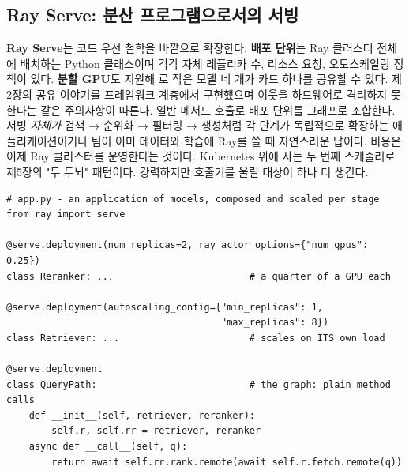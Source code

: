 \subsection*{Ray Serve: 분산 프로그램으로서의 서빙}

\textbf{Ray Serve}는 코드 우선 철학을 바깥으로 확장한다. \textbf{배포 단위}는 Ray 클러스터 전체에 배치하는 Python 클래스이며 각각 자체 레플리카 수, 리소스 요청, 오토스케일링 정책이 있다. \textbf{분할 GPU}도 지원해 로 작은 모델 네 개가 카드 하나를 공유할 수 있다. 제2장의 공유 이야기를 프레임워크 계층에서 구현했으며 이웃을 하드웨어로 격리하지 못한다는 같은 주의사항이 따른다. 일반 메서드 호출로 배포 단위를 그래프로 조합한다. 서빙 \textit{자체가} 검색 → 순위화 → 필터링 → 생성처럼 각 단계가 독립적으로 확장하는 애플리케이션이거나 팀이 이미 데이터와 학습에 Ray를 쓸 때 자연스러운 답이다. 비용은 이제 Ray 클러스터를 운영한다는 것이다. Kubernetes 위에 사는 두 번째 스케줄러로 제5장의 "두 두뇌" 패턴이다. 강력하지만 호출기를 울릴 대상이 하나 더 생긴다.

\begin{terminalbox}
\begin{Verbatim}[breaklines=true,breakanywhere=true,fontsize=\small,formatcom=\color{tbbtermfg},codes=\tbbcodeactive]
# app.py - an application of models, composed and scaled per stage
from ray import serve

@serve.deployment(num_replicas=2, ray_actor_options={"num_gpus": 0.25})
class Reranker: ...                        # a quarter of a GPU each

@serve.deployment(autoscaling_config={"min_replicas": 1,
                                      "max_replicas": 8})
class Retriever: ...                       # scales on ITS own load

@serve.deployment
class QueryPath:                           # the graph: plain method calls
    def __init__(self, retriever, reranker):
        self.r, self.rr = retriever, reranker
    async def __call__(self, q):
        return await self.rr.rank.remote(await self.r.fetch.remote(q))
\end{Verbatim}
\end{terminalbox}


